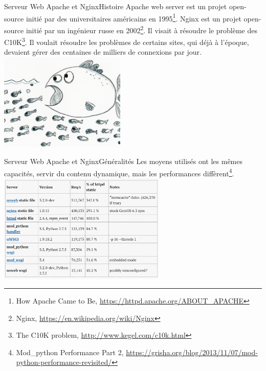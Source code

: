 \documentclass{beamer}
\begin{document}
    \begin{frame}{Serveur Web Apache et Nginx}{Histoire}
        Apache web server est un projet open-source initié par des universitaires américains en 1995\footnote{How Apache Came to Be, \url{https://httpd.apache.org/ABOUT_APACHE}}.
        \bigbreak
        Nginx est un projet open-source initié par un ingénieur russe en 2002\footnote{Nginx, \url{https://en.wikipedia.org/wiki/Nginx}}.
        Il visait à résoudre le problème des C10K\footnote{The C10K problem, \url{http://www.kegel.com/c10k.html}}.
        Il voulait résoudre les problèmes de certains sites, qui déjà à l'époque, devaient gérer des centaines de milliers de connexions par jour.
        \bigbreak
        \centering
        \includegraphics[width=6cm]{image/big-fish-eating-many-litlle-fishes}
    \end{frame}

    \begin{frame}{Serveur Web Apache et Nginx}{Généralités}
        Les moyens utilisés ont les mêmes capacités, servir du contenu dynamique, mais les performances diffèrent\footnote{Mod\_python Performance Part 2, \url{https://grisha.org/blog/2013/11/07/mod-python-performance-revisited/}}.
        \bigbreak
        \centering
        \includegraphics[width=8cm]{image/apache-nginx-benchmark}
    \end{frame}
\end{document}
